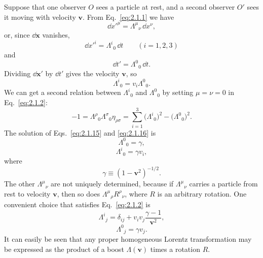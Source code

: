 Suppose that one observer \(O\) sees a particle at rest, and a second observer
\(O'\) sees it moving with velocity \(\mathbf v\). From Eq.~\eqref{eq:2.1.1}
we have
\begin{equation}
  \dd x'^\mu=\Lambda^\mu{}_\nu\,\dd x^\nu ,
  \tag{2.1.12}\label{eq:2.1.12}
\end{equation}
or, since \(\dd\mathbf{x}\) vanishes,
\begin{equation}
  \dd x'^i=\Lambda^i{}_0\,\dd t\qquad(i=1,2,3)
  \tag{2.1.13}\label{eq:2.1.13}
\end{equation}
and
\begin{equation}
  \dd t'=\Lambda^0{}_0\,\dd t .
  \tag{2.1.14}\label{eq:2.1.14}
\end{equation}
Dividing \(\dd\mathbf{x}'\) by \(\dd t'\) gives the velocity \(\mathbf v\), so
\begin{equation}
  \Lambda^i{}_0=v_i\Lambda^0{}_0 .
  \tag{2.1.15}\label{eq:2.1.15}
\end{equation}
We can get a second relation between \(\Lambda^i{}_0\) and
\(\Lambda^0{}_0\) by setting \(\mu=\nu=0\) in Eq.~\eqref{eq:2.1.2}:
\begin{equation}
  -1=\Lambda^\rho{}_0\Lambda^\sigma{}_0\eta_{\rho\sigma}
  =\sum_{i=1}^{3}\bigl(\Lambda^i{}_0\bigr)^2
   -\bigl(\Lambda^0{}_0\bigr)^2 .
  \tag{2.1.16}\label{eq:2.1.16}
\end{equation}
The solution of Eqs.~\eqref{eq:2.1.15} and \eqref{eq:2.1.16} is
\begin{equation}
  \Lambda^0{}_0=\gamma ,
  \tag{2.1.17}\label{eq:2.1.17}
\end{equation}
\begin{equation}
  \Lambda^i{}_0=\gamma v_i ,
  \tag{2.1.18}\label{eq:2.1.18}
\end{equation}
where
\begin{equation}
  \gamma\equiv(1-\mathbf v^2)^{-1/2}.
  \tag{2.1.19}\label{eq:2.1.19}
\end{equation}
The other \(\Lambda^\mu{}_\nu\) are not uniquely determined, because if
\(\Lambda^\mu{}_\nu\) carries a particle from rest to velocity \(\mathbf v\),
then so does \(\Lambda^\mu{}_\rho R^\rho{}_\nu\), where \(R\) is an arbitrary
rotation. One convenient choice that satisfies Eq.~\eqref{eq:2.1.2} is
\begin{equation}
  \Lambda^i{}_j=\delta_{ij}
  +v_iv_j\frac{\gamma-1}{\mathbf v^2},
  \tag{2.1.20}\label{eq:2.1.20}
\end{equation}
\begin{equation}
  \Lambda^0{}_j=\gamma v_j .
  \tag{2.1.21}\label{eq:2.1.21}
\end{equation}
It can easily be seen that any proper homogeneous Lorentz transformation may be
expressed as the product of a boost \(\Lambda(\mathbf v)\) times a rotation
\(R\).
